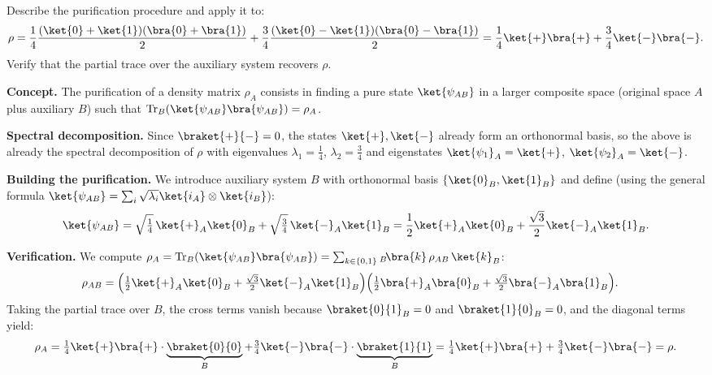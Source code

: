 \documentclass[oneside]{academica}
\begin{document}
\begin{exercise*}
  Describe the purification procedure and apply it to:
  \begin{equation*}
    \rho = \frac{1}{4}\frac{(\ket{0}+\ket{1})(\bra{0}+\bra{1})}{2}
         + \frac{3}{4}\frac{(\ket{0}-\ket{1})(\bra{0}-\bra{1})}{2}
         = \frac{1}{4}\ket{+}\bra{+} + \frac{3}{4}\ket{-}\bra{-}.
  \end{equation*}
  Verify that the partial trace over the auxiliary system recovers $\rho$.

  \textbf{Concept.}
  The purification of a density matrix $\rho_A$ consists in finding a pure state $\ket{\psi_{AB}}$ in a larger composite space (original space $A$ plus auxiliary $B$) such that $\tr_B(\ket{\psi_{AB}}\bra{\psi_{AB}})=\rho_A$.

  \textbf{Spectral decomposition.}
  Since $\braket{+}{-}=0$, the states $\ket{+},\ket{-}$ already form an orthonormal basis, so the above is already the spectral decomposition of $\rho$ with eigenvalues $\lambda_1=\tfrac{1}{4}$, $\lambda_2=\tfrac{3}{4}$ and eigenstates $\ket{\psi_1}_A=\ket{+}$, $\ket{\psi_2}_A=\ket{-}$.

  \textbf{Building the purification.}
  We introduce auxiliary system $B$ with orthonormal basis $\{\ket{0}_B,\ket{1}_B\}$ and define (using the general formula $\ket{\psi_{AB}}=\sum_i\sqrt{\lambda_i}\ket{i_A}\otimes\ket{i_B}$):
  \begin{equation*}
    \ket{\psi_{AB}} = \sqrt{\tfrac{1}{4}}\,\ket{+}_A\ket{0}_B
                    + \sqrt{\tfrac{3}{4}}\,\ket{-}_A\ket{1}_B
    = \frac{1}{2}\ket{+}_A\ket{0}_B + \frac{\sqrt{3}}{2}\ket{-}_A\ket{1}_B.
  \end{equation*}

  \textbf{Verification.}
  We compute $\rho_A = \tr_B(\ket{\psi_{AB}}\bra{\psi_{AB}}) = \sum_{k\in\{0,1\}}{}_B\!\bra{k}\,\rho_{AB}\,\ket{k}_B$:
  \begin{align*}
    \rho_{AB} &= \Bigl(\tfrac{1}{2}\ket{+}_A\ket{0}_B + \tfrac{\sqrt{3}}{2}\ket{-}_A\ket{1}_B\Bigr)
                 \Bigl(\tfrac{1}{2}\bra{+}_A\bra{0}_B + \tfrac{\sqrt{3}}{2}\bra{-}_A\bra{1}_B\Bigr).
  \end{align*}
  Taking the partial trace over $B$, the cross terms vanish because $\braket{0}{1}_B=0$
  and $\braket{1}{0}_B=0$, and the diagonal terms yield:
  \begin{equation*}
    \rho_A = \tfrac{1}{4}\ket{+}\bra{+}\cdot\underbrace{\braket{0}{0}}_B
           + \tfrac{3}{4}\ket{-}\bra{-}\cdot\underbrace{\braket{1}{1}}_B
           = \tfrac{1}{4}\ket{+}\bra{+} + \tfrac{3}{4}\ket{-}\bra{-} = \rho.
  \end{equation*}
\end{exercise*}
\end{document}
